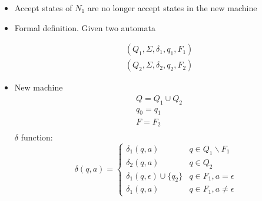 \begin{frame}[allowframebreaks]
\begin{center}
\end{center}


  \begin{itemize}
\item Accept states of $N_1$ are no longer accept states in the
  new machine

\item Formal definition. Given two automata

  \begin{equation*}
    \begin{split}
&(Q_1, \Sigma, \delta_1, q_1, F_1) \\
&(Q_2, \Sigma, \delta_2, q_2, F_2)
\end{split}
\end{equation*}

\item New machine
  \begin{equation*}
    \begin{split}
& Q=Q_1\cup Q_2 \\
& q_0 = q_1 \\
& F=F_2 \\
\end{split}
\end{equation*}
$\delta$ function:
\begin{equation*}
  \delta(q,a)=
  \begin{cases}
    \delta_1(q,a) & q \in Q_1\backslash F_1\\
\delta_2(q,a) & q \in Q_2\\
\delta_1(q,\epsilon) \cup \{q_2\} & q \in F_1, a =\epsilon\\
\delta_1(q,a) & q \in F_1, a \neq \epsilon
  \end{cases}
\end{equation*}
\end{itemize}
\end{frame}


